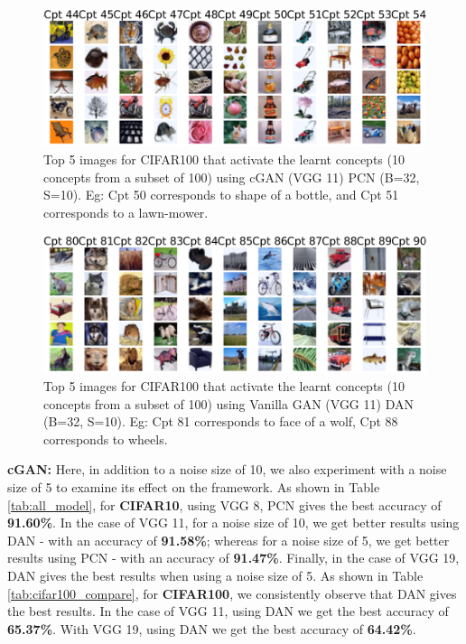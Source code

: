 \documentclass[letterpaper]{article}
\begin{document}
\begin{figure}[h!]
    \centering
    \includegraphics[width=1.0\columnwidth]{images/CGAN_11_1_10_1_cifar100.png}
    \caption{Top 5 images for CIFAR100 that activate the learnt concepts (10 concepts from a subset of 100) using cGAN (VGG 11) PCN  (B=32, S=10). Eg: Cpt 50 corresponds to shape of a bottle, and Cpt 51 corresponds to a lawn-mower.}
    \label{fig:cgan_11_cifar100}
\end{figure}

\begin{figure}[h!]
    \centering
    \includegraphics[width=1.0\columnwidth]{images/GAN_11_32_10_1_cifar100.png}
    \caption{Top 5 images for CIFAR100 that activate the learnt concepts (10 concepts from a subset of 100) using Vanilla GAN (VGG 11) DAN (B=32, S=10). Eg: Cpt 81 corresponds to face of a wolf, Cpt 88 corresponds to wheels.}
    \label{fig:cgan_11_cifar100}
\end{figure}

\textbf{cGAN:}\label{sec:cond_gan}
Here, in addition to a noise size of 10, we also experiment with a noise size of 5 to examine its effect on the framework.
As shown in Table \ref{tab:all_model}, for \textbf{CIFAR10}, using VGG 8, PCN gives the best accuracy of \textbf{91.60\%}. In the case of VGG 11, for a noise size of 10, we get better results using DAN - with an accuracy of \textbf{91.58\%}; whereas for a noise size of 5, we get better results using PCN - with an accuracy of \textbf{91.47\%}. Finally, in the case of VGG 19, DAN gives the best results when using a noise size of 5.
As shown in Table \ref{tab:cifar100_compare}, for \textbf{CIFAR100}, we consistently observe that DAN gives the best results. In the case of VGG 11, using DAN we get the best accuracy of \textbf{65.37\%}. With VGG 19, using DAN we get the best accuracy of \textbf{64.42\%}.
\end{document}
